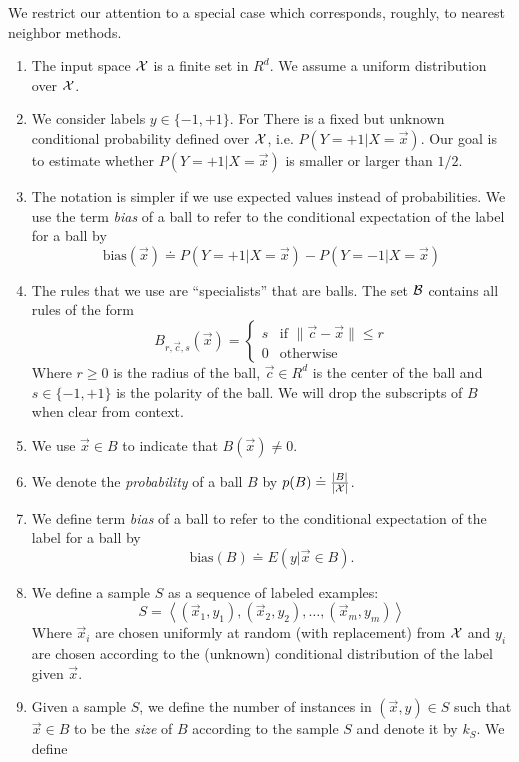 \documentclass{article}
\newcommand{\X}{{\cal X}}
\newcommand{\B}{{\cal B}}
\newcommand{\x}{\vec{x}}
\newcommand{\cc}{\vec{c}}
\newcommand{\bias}{\text{bias}}
\newcommand{\samp}{S}
\begin{document}
We restrict our attention to a special case which corresponds,
roughly, to nearest neighbor methods.
\begin{enumerate}
\item The input space $\X$ is a finite set in $R^d$. We assume a
  uniform distribution over $\X$.
  \item We consider labels $y\in \{-1,+1\}$. For There is a fixed but
    unknown conditional probability defined over $\X$, i.e. $P(Y=+1 |
    X=\x)$. Our goal is to estimate whether $P(Y=+1|X=\x)$ is smaller
    or larger than $1/2$.
  \item
    The notation is simpler if we use expected values instead of
    probabilities. We use the term {\em bias} of a ball to refer to the conditional
    expectation of the label for a ball by
    \[
    \bias(\x) \doteq P(Y=+1|X=\x) - P(Y=-1|X=\x)
    \]
  \item
    The rules that we use are ``specialists'' that are balls. The set
    $\B$ contains all rules of the form
    \[
    B_{r,\cc,s}(\x) =
    \begin{cases}
      s & \text{if } \| \cc- \x \| \leq r \\
    0 & \text{otherwise }
    \end{cases}
    \]
    Where $r \geq 0$ is the radius of the ball, $\cc \in R^d$ is the
    center of the ball and $s \in \{-1,+1\}$ is the polarity of the ball.
    We will drop the subscripts of $B$ when clear from context.
  \item
    We use $\x \in B$ to indicate that $B(\x) \neq 0$.
  \item
    We denote the {\em probability} of a ball $B$ by $p(B) \doteq
    \frac{|B|}{|\X|}$.
  \item
    We define term {\em bias} of a ball to refer to the conditional
    expectation of the label for a ball by
    \[
    \bias(B) \doteq E\left( y|\x \in B \right).
    \]
  \item We define a sample $\samp$ as a sequence of labeled examples:
    \[\samp= \left\langle (\x_1,y_1),(\x_2,y_2),\ldots,(\x_m,y_m)
    \right\rangle \]
    Where $\x_i$ are chosen uniformly at random (with replacement)
    from $\X$ and $y_i$ are chosen according to the (unknown)
    conditional distribution of the label given $\x$.
  \item Given a sample $\samp$, we define the number of instances in
    $(\x,y) \in \samp$ such that $\x \in B$ to be the {\em size} of
    $B$ according to the sample $\samp$ and denote it by $k_{\samp}$. We define

\end{enumerate}
\end{document}
